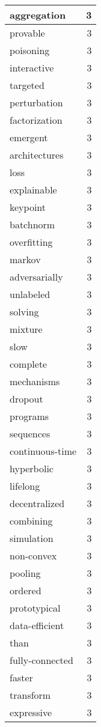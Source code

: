\begin{table}[h]
\begin{tabular}{|l|r|}
\hline
aggregation & 3 \\
\hline
provable & 3 \\
\hline
poisoning & 3 \\
\hline
interactive & 3 \\
\hline
targeted & 3 \\
\hline
perturbation & 3 \\
\hline
factorization & 3 \\
\hline
emergent & 3 \\
\hline
architectures & 3 \\
\hline
loss & 3 \\
\hline
explainable & 3 \\
\hline
keypoint & 3 \\
\hline
batchnorm & 3 \\
\hline
overfitting & 3 \\
\hline
markov & 3 \\
\hline
adversarially & 3 \\
\hline
unlabeled & 3 \\
\hline
solving & 3 \\
\hline
mixture & 3 \\
\hline
slow & 3 \\
\hline
complete & 3 \\
\hline
mechanisms & 3 \\
\hline
dropout & 3 \\
\hline
programs & 3 \\
\hline
sequences & 3 \\
\hline
continuous-time & 3 \\
\hline
hyperbolic & 3 \\
\hline
lifelong & 3 \\
\hline
decentralized & 3 \\
\hline
combining & 3 \\
\hline
simulation & 3 \\
\hline
non-convex & 3 \\
\hline
pooling & 3 \\
\hline
ordered & 3 \\
\hline
prototypical & 3 \\
\hline
data-efficient & 3 \\
\hline
than & 3 \\
\hline
fully-connected & 3 \\
\hline
faster & 3 \\
\hline
transform & 3 \\
\hline
expressive & 3 \\

\end{tabular}
\end{table}
